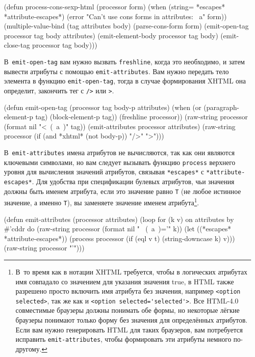 \begin{myverb}
(defun process-cons-sexp-html (processor form)
  (when (string= *escapes* *attribute-escapes*)
    (error "Can't use cons forms in attributes: ~a" form))
  (multiple-value-bind (tag attributes body) (parse-cons-form form)
    (emit-open-tag     processor tag body attributes)
    (emit-element-body processor tag body)
    (emit-close-tag    processor tag body)))
\end{myverb}

В~\lstinline{emit-open-tag} вам нужно вызвать \lstinline{freshline}, когда это необходимо, и затем
вывести атрибуты с помощью \lstinline{emit-attributes}. Вам нужно передать тело элемента в
функцию \lstinline{emit-open-tag}, тогда в случае формирования XHTML она определит, закончить
тег с \lstinline{/>} или \lstinline{>}.

\begin{myverb}
(defun emit-open-tag (processor tag body-p attributes)
  (when (or (paragraph-element-p tag) (block-element-p tag))
    (freshline processor))
  (raw-string processor (format nil "<~(~a~)" tag))
  (emit-attributes processor attributes)
  (raw-string processor (if (and *xhtml* (not body-p)) "/>" ">")))
\end{myverb}

В~\lstinline{emit-attributes} имена атрибутов не вычисляются, так как они являются
ключевыми символами, но вам следует вызывать функцию \lstinline{process} верхнего уровня
для вычисления значений атрибутов, связывая \lstinline{*escapes*} с
\lstinline{*attribute-escapes*}. Для удобства при спецификации булевых атрибутов, чьи
значения должны быть именем атрибута, если это значение равно \lstinline{Т} (не любое
истинное значение, а именно \lstinline{Т}), вы заменяете значение именем
атрибута\footnote{В~то время как в нотации XHTML требуется, чтобы в логических атрибутах
  имя совпадало со значением для указания значения true, в HTML также разрешено просто
  включить имя атрибута без значения, например \lstinline{<option selected>}, так же как и
  \lstinline{<option selected='selected'>}. Все HTML-4.0 совместимые браузеры должны
  понимать обе формы, но некоторые лёгкие браузеры понимают только форму без значения для
  определённых атрибутов. Если вам нужно генерировать HTML для таких браузеров, вам
  потребуется исправить \lstinline{emit-attributes}, чтобы формировать эти атрибуты
  немного по-другому.}\hspace{\footnotenegspace}.

\begin{myverb}
(defun emit-attributes (processor attributes)
  (loop for (k v) on attributes by #'cddr do
       (raw-string processor (format nil " ~(~a~)='" k))
       (let ((*escapes* *attribute-escapes*))
         (process processor (if (eql v t) (string-downcase k) v)))
       (raw-string processor "'")))
\end{myverb}

